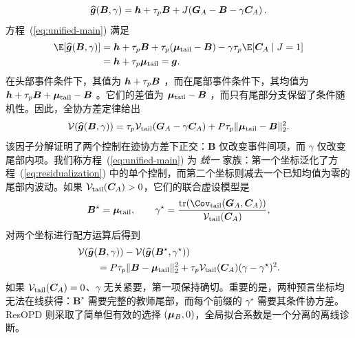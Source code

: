 \begin{equation}
 \widehat{\bm{g}}(\bm B,\gamma)
 =\bm{h}+\tau_p\bm B
 +J\!\left(\bm{G}_A-\bm B-\gamma\bm{C}_A\right).
 \label{eq:unified-main}
\end{equation}
方程~(\ref{eq:unified-main}) 满足
\begin{equation}
 \begin{aligned}
 \E\!\left[\widehat{\bgrad}(\bm B,\gamma)\right]
 &=\bhead+\tau_p\bm B
   +\tau_p(\bmean_{\mathrm{tail}}-\bm B)
   -\gamma\tau_p\E[\bfluct_A\mid J=1]\\
 &=\bhead+\tau_p\bmean_{\mathrm{tail}}
  =\bgrad.
 \end{aligned}
 \label{eq:family-unbiased-proof}
\end{equation}
在头部事件条件下，其值为 $\bm{h}+\tau_p\bm B$ ，而在尾部事件条件下，其均值为 $\bm{h}+\tau_p\bm B+\bm{\mu}_{\mathrm{tail}}-\bm B$ 。它们的差值为 $\bm{\mu}_{\mathrm{tail}}-\bm B$ ，而只有尾部分支保留了条件随机性。因此，全协方差定律给出
\begin{equation}
 \mathcal V\!\left(\widehat{\bm{g}}(\bm B,\gamma)\right)
 =\tau_p\mathcal V_{\mathrm{tail}}(\bm{G}_A-\gamma\bm{C}_A)
 +P\tau_p\lVert\bm{\mu}_{\mathrm{tail}}-\bm B\rVert_2^2.
 \label{eq:two-level-variance}
\end{equation}
该因子分解证明了两个控制在迹协方差下正交：$\bm B$ 仅改变事件间项，而 $\gamma$ 仅改变尾部内项。我们称方程~(\ref{eq:unified-main}) 为 \emph{统一} 家族：第一个坐标泛化了方程~(\ref{eq:residualization}) 中的单个控制，而第二个坐标则减去一个已知均值为零的尾部内波动。如果 $\mathcal V_{\mathrm{tail}}(\bm{C}_A)>0$，它们的联合虚设模型是
\begin{equation}
 \bm B^\star=\bmean_{\mathrm{tail}},\qquad
 \gamma^\star=
 \frac{\operatorname{tr}\!\left(
       \Cov_{\mathrm{tail}}(\btoken_A,\bfluct_A)\right)}
      {\mathcal V_{\mathrm{tail}}(\bfluct_A)},
 \label{eq:joint-oracle}
\end{equation}
对两个坐标进行配方运算后得到
\begin{equation}
 \begin{aligned}
 &\mathcal V\!\left(\widehat{\bm{g}}(\bm B,\gamma)\right)
 -\mathcal V\!\left(
   \widehat{\bm{g}}(\bm B^\star,\gamma^\star)\right)\\
 &\qquad
 =P\tau_p\lVert\bm B-\bm{\mu}_{\mathrm{tail}}\rVert_2^2
 +\tau_p\mathcal V_{\mathrm{tail}}(\bm{C}_A)
  (\gamma-\gamma^\star)^2.
 \end{aligned}
 \label{eq:unified-regret-main}
\end{equation}
如果 $\mathcal V_{\mathrm{tail}}(\bm{C}_A)=0$、$\gamma$ 无关紧要，第一项保持确切。重要的是，两种预言坐标均无法在线获得：$\bm B^\star$ 需要完整的教师尾部，而每个前缀的 $\gamma^\star$ 需要其条件协方差。ResOPD 则采取了简单但有效的选择 $(\bm{\mu}_B,0)$，全局拟合系数是一个分离的离线诊断。

